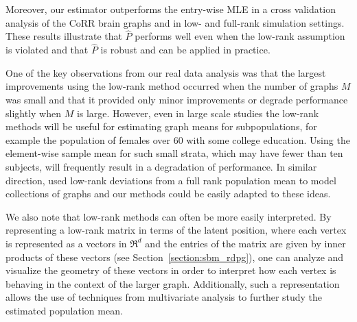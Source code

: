 \documentclass[10pt,letterpaper]{article}
\begin{document}
Moreover, our estimator outperforms the entry-wise MLE in a cross validation analysis of the CoRR brain graphs and in low- and full-rank simulation settings.
These results illustrate that $\hat{P}$ performs well even when the low-rank assumption is violated and that $\hat{P}$ is robust and can be applied in practice.

One of the key observations from our real data analysis was that the largest improvements using the low-rank method occurred when the number of graphs $M$ was small and that it provided only minor improvements or degrade performance slightly when $M$ is large. 
However, even in large scale studies the low-rank methods will be useful for estimating graph means for subpopulations, for example the population of females over 60 with some college education.
Using the element-wise sample mean for such small strata, which may have fewer than ten subjects, will frequently result in a degradation of performance.
In similar direction, \citet{durante2014nonparametric} used low-rank deviations from a full rank population mean to model collections of graphs and our methods could be easily adapted to these ideas.

We also note that low-rank methods can often be more easily interpreted.
By representing a low-rank matrix in terms of the latent position, where each vertex is represented as a vectors in $\Re^d$ and the entries of the matrix are given by inner products of these vectors (see Section~\ref{section:sbm_rdpg}), one can analyze and visualize the geometry of these vectors in order to interpret how each vertex is behaving in the context of the larger graph. 
Additionally, such a representation allows the use of techniques from multivariate analysis to further study the estimated population mean.




\end{document}

